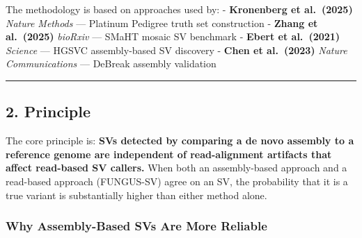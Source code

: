 \documentclass[
]{article}
\begin{document}
The methodology is based on approaches used by: - \textbf{Kronenberg et
al.~(2025)} \emph{Nature Methods} --- Platinum Pedigree truth set
construction - \textbf{Zhang et al.~(2025)} \emph{bioRxiv} --- SMaHT
mosaic SV benchmark - \textbf{Ebert et al.~(2021)} \emph{Science} ---
HGSVC assembly-based SV discovery - \textbf{Chen et al.~(2023)}
\emph{Nature Communications} --- DeBreak assembly validation

\begin{center}\rule{0.5\linewidth}{0.5pt}\end{center}

\hypertarget{principle}{%
\subsection{2. Principle}\label{principle}}

The core principle is: \textbf{SVs detected by comparing a de novo
assembly to a reference genome are independent of read-alignment
artifacts that affect read-based SV callers.} When both an
assembly-based approach and a read-based approach (FUNGUS-SV) agree on
an SV, the probability that it is a true variant is substantially higher
than either method alone.

\hypertarget{why-assembly-based-svs-are-more-reliable}{%
\subsubsection{Why Assembly-Based SVs Are More
Reliable}\label{why-assembly-based-svs-are-more-reliable}}
\end{document}
